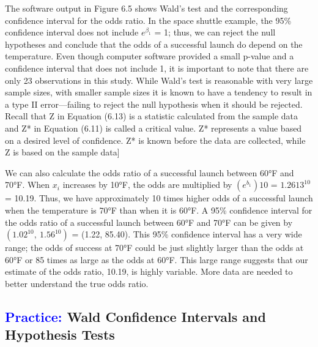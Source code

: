 \documentclass[
]{report}
\begin{document}
The software output in Figure 6.5 shows Wald's test and the corresponding confidence interval for the
odds ratio. In the space shuttle example, the 95\% confidence interval does not include \(\scriptstyle e^{\beta_1}\) = 1; thus, we can reject the null hypotheses and conclude that the odds of a successful launch do depend on the temperature. Even though computer software provided a small p-value and a confidence interval that does not include 1, it is important to note that there are only 23 observations in this study. While Wald's test is reasonable with very large sample sizes, with smaller sample sizes it is known to have a tendency to result in a type II error---failing to reject the null hypothesis when it should be rejected. Recall that Z in Equation (6.13) is a statistic calculated from the sample data and Z* in Equation (6.11) is called a critical value. Z* represents a value based on a desired level of confidence. Z* is known before the data are collected, while Z is based on the sample data{]}

We can also calculate the odds ratio of a successful launch between 60°F and 70°F. When \(\scriptstyle x_i\)
increases by 10°F, the odds are multiplied by \(\scriptstyle (e^{b_1})10\) = \(\scriptstyle 1.2613^{10}\) = 10.19. Thus, we have approximately 10 times higher odds of a successful launch when the temperature is 70°F than when it is 60°F. A 95\% confidence interval for the odds ratio of a successful launch between 60°F and 70°F can be given by \(\scriptstyle (1.02^{10}, \ 1.56^{10})\) = (1.22, 85.40). This 95\% confidence interval has a very wide range; the odds of success at 70°F could be just slightly larger than the odds at 60°F or 85 times as large as the odds at 60°F. This large range suggests that our estimate of the odds ratio, 10.19, is highly variable. More data are needed to better understand the true odds ratio.

\hypertarget{wald-confidence-intervals-and-hypothesis-tests}{%
\subsection*{\texorpdfstring{\textcolor{blue}{Practice:} Wald Confidence Intervals and Hypothesis Tests}{ Wald Confidence Intervals and Hypothesis Tests}}\label{wald-confidence-intervals-and-hypothesis-tests}}
\end{document}
